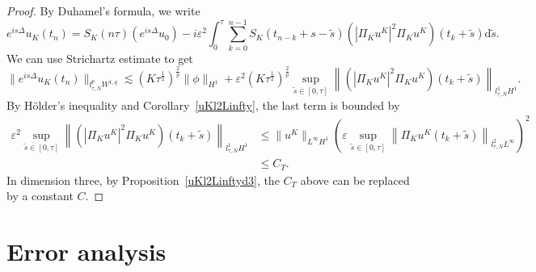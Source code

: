 \documentclass[10pt,a4paper]{article}
\begin{document}
  \begin{proof}
    By Duhamel's formula, we write
    \begin{equation}
      e^{is\Delta}u_K(t_n) = S_K(n\tau) (e^{is\Delta} u_0) 
      -i\varepsilon^2 \int_{0}^{\tau} \sum_{k=0}^{n-1} S_K(t_{n-k}+s-\tilde{s}) 
      \left(|\Pi_K u^K|^2 \Pi_K u^K\right)(t_k+\tilde{s}) \mathrm{d} \tilde{s}.
    \end{equation}
    We can use Strichartz estimate to get
      \[ \|e^{is\Delta} u_K(t_n)\|_{l^p_{\tau,N}W^{1,q}} \lesssim
      (K\tau^\frac12)^\frac2p \|\phi\|_{H^1} 
      + \varepsilon^2
      (K\tau^\frac12)^\frac2p \sup_{\tilde{s}\in[0,\tau]}\left\| 
      \left(|\Pi_K u^K|^2 \Pi_K u^K\right)(t_k+\tilde{s}) \right\|_{l^1_{\tau,N}H^1}. \]
    By H\"older's inequality and Corollary~\ref{uKl2Linfty}, the last term is
    bounded by
    \begin{equation*}
      \begin{aligned}
        \varepsilon^2 \sup_{\tilde{s}\in[0,\tau]}\left\| 
        \left(|\Pi_K u^K|^2 \Pi_K u^K\right)(t_k+\tilde{s}) \right\|_{l^1_{\tau,N}H^1} 
        &\leq \|u^K\|_{L^\infty H^1} \left( \varepsilon \sup_{\tilde{s} \in [0,\tau]} 
        \left\|\Pi_K u^K(t_k+\tilde{s})\right\|_{l_{\tau, N}^2
        L^{\infty}}\right)^2\\
        &\leq C_T.
      \end{aligned}
    \end{equation*}
    In dimension three, by Proposition~\ref{uKl2Linftyd3}, the \(C_T\) above can be
    replaced by a constant \(C\).
  \end{proof}

  \section{Error analysis}\label{sec:err-anal}
\end{document}
